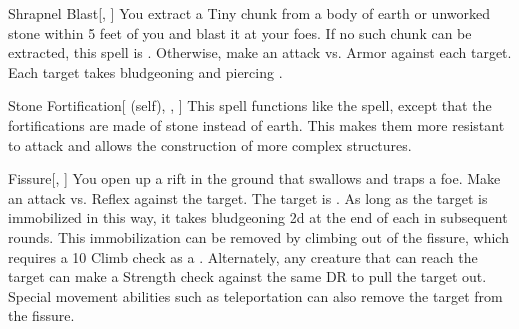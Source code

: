 \lowercase{\hypertarget{spell:Shrapnel Blast}{}}\label{spell:Shrapnel Blast}
\begin{freeability}[Rank 4]{\hypertarget{spell:Shrapnel Blast}{Shrapnel Blast}}[, ]
You extract a Tiny chunk from a body of earth or unworked stone within 5 feet of you and blast it at your foes.
If no such chunk can be extracted, this spell is .
Otherwise, make an attack vs. Armor against each target.
\hit Each target takes bludgeoning and piercing .
\end{freeability}
\vspace{0.25em}



\lowercase{\hypertarget{spell:Stone Fortification}{}}\label{spell:Stone Fortification}
\begin{attuneability}[Rank 4]{\hypertarget{spell:Stone Fortification}{Stone Fortification}}[ (self), , ]
This spell functions like the  spell, except that the fortifications are made of stone instead of earth.
This makes them more resistant to attack and allows the construction of more complex structures.
\end{attuneability}
\vspace{0.25em}



\lowercase{\hypertarget{spell:Fissure}{}}\label{spell:Fissure}
\begin{freeability}[Rank 5]{\hypertarget{spell:Fissure}{Fissure}}[, ]
You open up a rift in the ground that swallows and traps a foe.
Make an attack vs. Reflex against the target.
\hit The target is .
As long as the target is immobilized in this way,
it takes bludgeoning  \minus2d at the end of each  in subsequent rounds.
This immobilization can be removed by climbing out of the fissure, which requires a  10 Climb check as a .
Alternately, any creature that can reach the target can make a Strength check against the same DR to pull the target out.
Special movement abilities such as teleportation can also remove the target from the fissure.
\end{freeability}
\vspace{0.25em}



